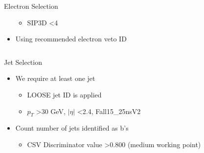 \documentclass{beamer}
\begin{document}
\begin{frame}
\begin{columns}
\begin{block}{Electron Selection}
\begin{adjustwidth}{-0.5em}{-0.5em}
\begin{itemize}
\begin{itemize}
\item SIP3D \textless 4
\end{itemize}
\item Using recommended electron veto ID
\end{itemize}
\vspace{.1cm}
\end{adjustwidth}
\end{block}
\end{columns}
\begin{block}{Jet Selection}
\vspace{0.2cm}
 \tiny
  \begin{itemize}
\item We require at least one jet
\begin{itemize}
\tiny
\item LOOSE jet ID is applied
\item $ p_{T}$ \textgreater 30 GeV, $|\eta|$ \textless 2.4, Fall15\_25nsV2
\end{itemize}
\item Count number of jets identified as b's
\begin{itemize}
\tiny
\item CSV Discriminator value \textgreater 0.800 (medium working point)
\end{itemize}
\end{itemize}
\vspace{.1cm}
\end{block}
\end{frame}
\end{document}

